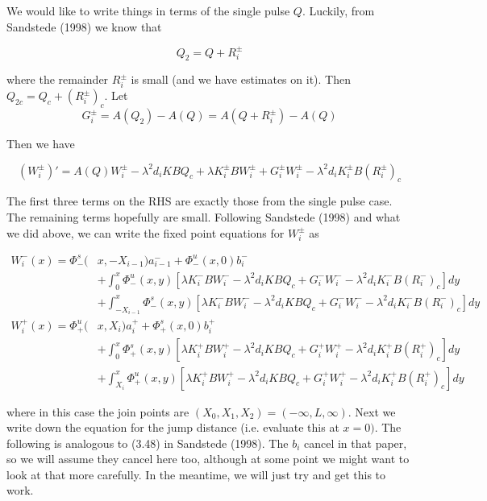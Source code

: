\documentclass[12pt]{article}
\begin{document}
We would like to write things in terms of the single pulse $Q$. Luckily, from Sandstede (1998) we know that

\[
Q_2 = Q + R_i^\pm
\]

where the remainder $R_i^\pm$ is small (and we have estimates on it). Then $Q_{2c} = Q_c + (R_i^\pm)_c$. Let
\[
G_i^\pm = A(Q_2) - A(Q) = A(Q + R_i^\pm) - A(Q)
\]

Then we have

\begin{equation}\label{inteigQ}
(W_i^\pm)' = A(Q)W_i^\pm - \lambda^2 d_i KBQ_{c} + \lambda K_i^\pm BW_i^\pm + G_i^\pm W_i^\pm - \lambda^2 d_i K_i^\pm B (R_i^\pm)_c
\end{equation}  

The first three terms on the RHS are exactly those from the single pulse case. The remaining terms hopefully are small. Following Sandstede (1998) and what we did above, we can write the fixed point equations for $W_i^\pm$ as

\begin{align*}
W_i^-(x) = \Phi^s_-(&x, -X_{i-1})a_{i-1}^- + \Phi^u_-(x, 0)b_i^- \\
&+ \int_0^x \Phi^u_-(x, y)[\lambda K_i^- BW_i^- - \lambda^2 d_i KBQ_{c} + G_i^- W_i^- - \lambda^2 d_i K_i^- B (R_i^-)_c ] dy \\
&+ \int_{-X_{i-1}}^x \Phi^s_-(x, y)[\lambda K_i^- BW_i^- - \lambda^2 d_i KBQ_{c} + G_i^- W_i^- - \lambda^2 d_i K_i^- B (R_i^-)_c ] dy \\
W_i^+(x) = \Phi^u_+(&x, X_i)a_i^+ + \Phi^s_+(x, 0)b_i^+ \\
&+ \int_0^x \Phi^s_+(x, y)[\lambda K_i^+ BW_i^+ - \lambda^2 d_i KBQ_{c} + G_i^+ W_i^+ - \lambda^2 d_i K_i^+ B (R_i^+)_c ] dy \\
&+ \int_{X_i}^x \Phi^u_+(x, y)[\lambda K_i^+ BW_i^+ - \lambda^2 d_i KBQ_{c} + G_i^+ W_i^+ - \lambda^2 d_i K_i^+ B (R_i^+)_c ]dy
\end{align*}

where in this case the join points are $(X_0, X_1, X_2) = (-\infty, L, \infty)$. Next we write down the equation for the jump distance (i.e. evaluate this at $x = 0)$. The following is analogous to (3.48) in Sandstede (1998). The $b_i$ cancel in that paper, so we will assume they cancel here too, although at some point we might want to look at that more carefully. In the meantime, we will just try and get this to work.
\end{document}
